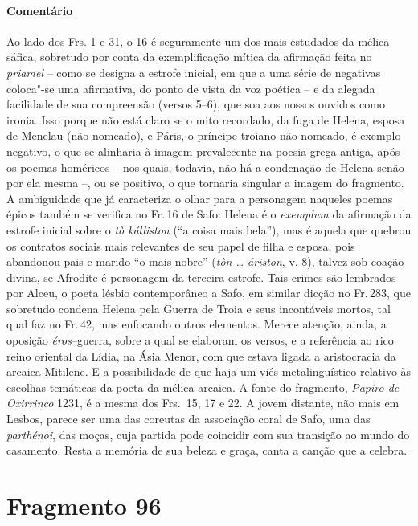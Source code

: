 \paragraph{Comentário} Ao lado dos Frs. 1 e 31, o 16 é seguramente um dos mais estudados da mélica
sáfica, sobretudo por conta da exemplificação mítica da afirmação feita no
\textit{priamel} -- como
se designa a estrofe inicial, em que a uma série de
negativas coloca"-se uma afirmativa, do ponto de vista da voz poética -- e da
alegada facilidade de sua compreensão (versos 5--6), que soa aos nossos ouvidos
como ironia. Isso porque não está claro se o mito recordado, da fuga de Helena, esposa 
de Menelau (não nomeado), e Páris, o príncipe troiano não nomeado, é exemplo
negativo, o que se alinharia à imagem prevalecente na poesia grega antiga, após
os poemas homéricos -- nos quais, todavia, não há a condenação de Helena senão por ela mesma --, ou se positivo, o que tornaria singular a imagem do fragmento. A
ambiguidade que já caracteriza o olhar para a personagem naqueles poemas épicos também se verifica no Fr.\,16 de Safo: Helena é o \textit{exemplum} da afirmação da estrofe inicial sobre o \textit{tò kálliston} (``a coisa mais bela''), mas é aquela que quebrou os contratos sociais mais relevantes de seu papel de filha e esposa, pois abandonou pais e marido ``o mais nobre'' (\textit{tòn \ldots{} áriston}, v. 8), talvez sob coação divina, se Afrodite é personagem da terceira estrofe. Tais crimes são lembrados por Alceu, o poeta lésbio contemporâneo a Safo, em similar dicção no Fr.\,283, que sobretudo condena Helena pela Guerra de Troia e seus incontáveis mortos, tal qual faz no Fr.\,42, mas enfocando outros elementos. Merece atenção, ainda, a
oposição \textit{éros}--guerra, sobre a qual se elaboram os versos, e a
referência ao rico reino oriental da Lídia, na Ásia Menor, com que estava
ligada a aristocracia da arcaica Mitilene. E a possibilidade de que haja um
viés metalinguístico relativo às escolhas temáticas da poeta da mélica arcaica.
A fonte do fragmento, \textit{Papiro de Oxirrinco} 1231, é a mesma dos Frs.~15, 17 e 22.
A jovem distante, não mais em Lesbos, parece ser uma das coreutas da associação coral de Safo, uma das \textit{parthénoi}, das moças, cuja partida pode coincidir com sua transição ao mundo do casamento. Resta a memória de sua beleza e graça, canta a canção que a celebra.




\pagebreak
\section{Fragmento 96}

